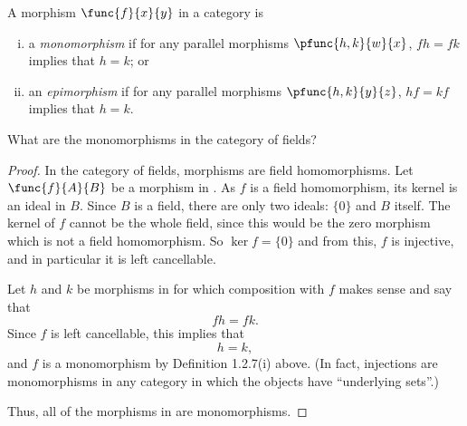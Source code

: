 \documentclass[main.tex]{subfiles}
\begin{document}
\begin{definition}
	A morphism \(\func{f}{x}{y}\) in a category is
	\begin{enumerate}[(i)]
		\item a \emph{monomorphism} if for any parallel morphisms
		\(\pfunc{h,k}{w}{x}\), \(fh=fk\) implies that \(h=k\); or
		\item an \emph{epimorphism} if for any parallel morphisms
		\(\pfunc{h,k}{y}{z}\), \(hf=kf\) implies that \(h=k\).
	\end{enumerate}
\end{definition}
\popthm

\begin{exercise}
	What are the monomorphisms in the category of fields?
\end{exercise}
\begin{proof}
In the category of fields, morphisms are field homomorphisms. Let
\(\func{f}{A}{B}\) be a morphism in \Field. As \(f\) is a field homomorphism,
its kernel is an ideal in \(B\). Since \(B\) is a field, there are only two
ideals: \(\{0\}\) and \(B\) itself. The kernel of \(f\) cannot be the whole
field, since this would be the zero morphism which is not a field homomorphism.
So \(\ker f = \{0\}\) and from this, \(f\) is injective, and in particular it is
left cancellable.

Let \(h\) and \(k\) be morphisms in \Field for which composition with \(f\)
makes sense and say that \[fh = fk.\] Since \(f\) is left cancellable, this
implies that \[h = k,\] and \(f\) is a monomorphism by Definition 1.2.7(i) above.
(In fact, injections are monomorphisms in any category in which the objects have
``underlying sets''.)

Thus, all of the morphisms in \Field are monomorphisms.
\end{proof}
\end{document}
